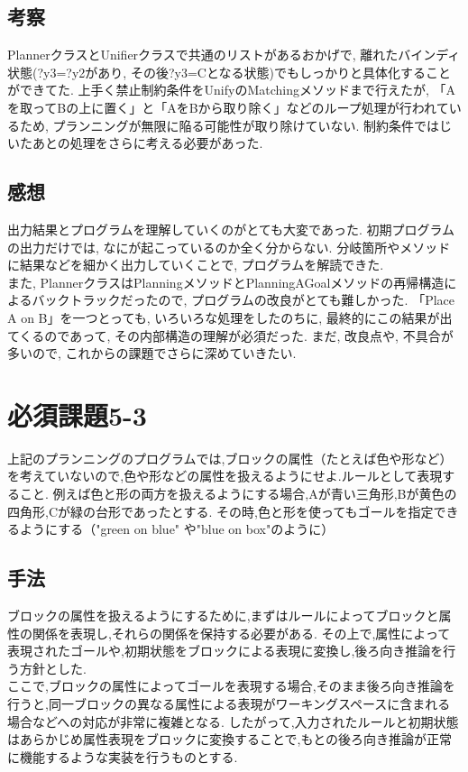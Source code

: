 \documentclass[uplatex,12pt]{jsarticle}
\begin{document}
\subsection{考察}
PlannerクラスとUnifierクラスで共通のリストがあるおかげで, 離れたバインディ状態(?y3=?y2があり, その後?y3=Cとなる状態)でもしっかりと具体化することができてた. 上手く禁止制約条件をUnifyのMatchingメソッドまで行えたが, 「Aを取ってBの上に置く」と「AをBから取り除く」などのループ処理が行われているため, プランニングが無限に陥る可能性が取り除けていない. 制約条件ではじいたあとの処理をさらに考える必要があった.

\subsection{感想}
出力結果とプログラムを理解していくのがとても大変であった. 初期プログラムの出力だけでは, なにが起こっているのか全く分からない. 分岐箇所やメソッドに結果などを細かく出力していくことで, プログラムを解読できた.\\
また, PlannerクラスはPlanningメソッドとPlanningAGoalメソッドの再帰構造によるバックトラックだったので, プログラムの改良がとても難しかった. 「Place A on B」を一つとっても, いろいろな処理をしたのちに, 最終的にこの結果が出てくるのであって, その内部構造の理解が必須だった. まだ, 改良点や, 不具合が多いので, これからの課題でさらに深めていきたい.


\section{必須課題5-3}
\begin{screen}
    上記のプランニングのプログラムでは,ブロックの属性（たとえば色や形など）を考えていないので,色や形などの属性を扱えるようにせよ.ルールとして表現すること.
    例えば色と形の両方を扱えるようにする場合,Aが青い三角形,Bが黄色の四角形,Cが緑の台形であったとする.
    その時,色と形を使ってもゴールを指定できるようにする（"green on blue" や"blue on box"のように）
\end{screen}
\subsection{手法}
ブロックの属性を扱えるようにするために,まずはルールによってブロックと属性の関係を表現し,それらの関係を保持する必要がある.
その上で,属性によって表現されたゴールや,初期状態をブロックによる表現に変換し,後ろ向き推論を行う方針とした. \\
ここで,ブロックの属性によってゴールを表現する場合,そのまま後ろ向き推論を行うと,同一ブロックの異なる属性による表現がワーキングスペースに含まれる場合などへの対応が非常に複雑となる.
したがって,入力されたルールと初期状態はあらかじめ属性表現をブロックに変換することで,もとの後ろ向き推論が正常に機能するような実装を行うものとする.
\end{document}
